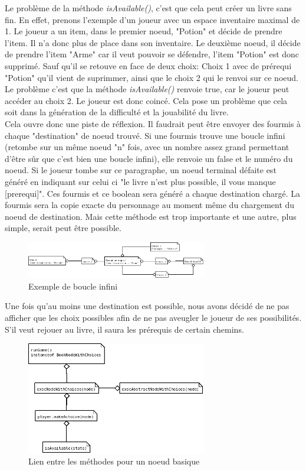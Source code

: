 		Le problème de la méthode \textit{isAvailable()}, c'est que cela peut créer un livre sans fin. En effet, prenons l'exemple d'un joueur avec un espace inventaire maximal de 1. Le joueur a un item, dans le premier noeud, "Potion" et décide de prendre l'item. Il n'a donc plus de place dans son inventaire. Le deuxième noeud, il décide de prendre l'item "Arme" car il veut pouvoir se défendre, l'item "Potion" est donc supprimé. Sauf qu'il se retouve en face de deux choix: Choix 1 avec de prérequi "Potion" qu'il vient de suprimmer, ainsi que le choix 2 qui le renvoi sur ce noeud. Le problème c'est que la méthode \textit{isAvailable()} renvoie true, car le joueur peut accéder au choix 2. Le joueur est donc coincé. Cela pose un problème que cela soit dans la génération de la difficulté et la jouabilité du livre.\\
		Cela ouvre donc une piste de réflexion. Il faudrait peut être envoyer des fourmis à chaque "destination" de noeud trouvé. Si une fourmis trouve une boucle infini (retombe sur un même noeud "n" fois, avec un nombre assez grand permettant d'être sûr que c'est bien une boucle infini), elle renvoie un false et le numéro du noeud. Si le joueur tombe sur ce paragraphe, un noeud terminal défaite est généré en indiquant sur celui ci "le livre n'est plus possible, il vous manque [prerequi]". Ces fourmis et ce boolean sera généré a chaque destination chargé. La fourmis sera la copie exacte du personnage au moment même du chargement du noeud de destination. Mais cette méthode est trop importante et une autre, plus simple, serait peut être possible.

		\begin{figure}[H]
			\centering\includegraphics[width=0.70\textwidth]{img/JeuBoucleInfiniExemple.png}
			\caption{Exemple de boucle infini}
		\end{figure}


		Une fois qu'au moins une destination est possible, nous avons décidé de ne pas afficher que les choix possibles afin de ne pas aveugler le joueur de ses possibilités. S'il veut rejouer au livre, il saura les prérequis de certain chemins.


		\begin{figure}[H]
			\centering\includegraphics[width=0.70\textwidth]{img/JeuBookNodeWithChoices.png}
			\caption{Lien entre les méthodes pour un noeud basique}
			\label{fig:JeuBookNodeWithChoices}
		\end{figure}


